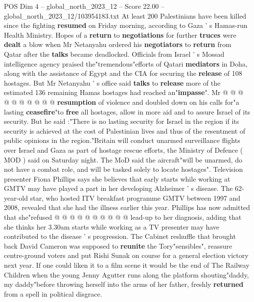 \begin{textsample}{POS Dim 4 – global\_north\_2023\_12 – Score 22.00 – global\_north\_2023\_12/103954183.txt}
At least 200 Palestinians have been killed since the fighting \textbf{resumed} on Friday morning, according to Gaza ' s Hamas-run Health Ministry.
Hopes of a \textbf{return} to \textbf{negotiations} for further \textbf{truces} were \textbf{dealt} a blow when Mr Netanyahu ordered his \textbf{negotiators} to \textbf{return} from Qatar after the \textbf{talks} became deadlocked.
Officials from Israel ' s Mossad intelligence agency praised the"tremendous"efforts of Qatari \textbf{mediators} in Doha, along with the assistance of Egypt and the CIA for securing the \textbf{release} of 108 hostages.
But Mr Netanyahu ' s office said \textbf{talks} to \textbf{release} more of the estimated 136 remaining Hamas hostages had reached an"\textbf{impasse}".
Mr @ @ @ @ @ @ @ @ @ @ \textbf{resumption} of violence and doubled down on his calls for"a lasting \textbf{ceasefire}"to \textbf{free} all hostages, allow in more aid and to assure Israel of its security.
But he said :"There is no lasting security for Israel in the region if its security is achieved at the cost of Palestinian lives and thus of the resentment of public opinions in the region."Britain will conduct unarmed surveillance flights over Israel and Gaza as part of hostage rescue efforts, the Ministry of Defence ( MOD ) said on Saturday night.
The MoD said the aircraft"will be unarmed, do not have a combat role, and will be tasked solely to locate hostages".
Television presenter Fiona Phillips says she believes that early starts while working at GMTV may have played a part in her developing Alzheimer ' s disease.
The 62-year-old star, who hosted ITV breakfast programme GMTV between 1997 and 2008, revealed that she had the illness earlier this year.
Phillips has now admitted that she"refused @ @ @ @ @ @ @ @ @ @ lead-up to her diagnosis, adding that she thinks her 3.30am starts while working as a TV presenter may have contributed to the disease ' s progression.
The Cabinet reshuffle that brought back David Cameron was supposed to \textbf{reunite} the Tory"sensibles", reassure centre-ground voters and put Rishi Sunak on course for a general election victory next year.
If one could liken it to a film scene it would be the end of The Railway Children when the young Jenny Agutter runs along the platform shouting"daddy, my daddy"before throwing herself into the arms of her father, freshly \textbf{returned} from a spell in political disgrace.

\end{textsample}
